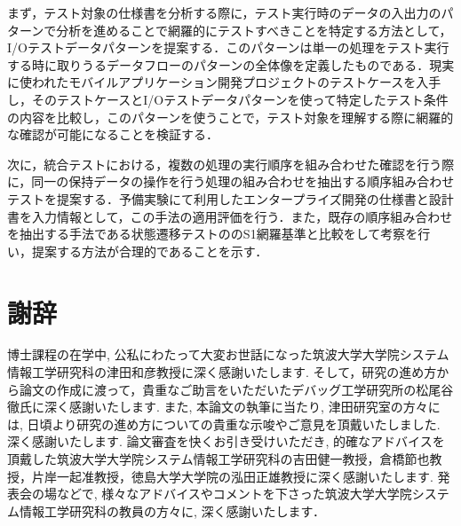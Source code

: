 \documentclass[a4paper,12pt]{jreport}
\begin{document}
まず，テスト対象の仕様書を分析する際に，テスト実行時のデータの入出力のパターンで分析を進めることで網羅的にテストすべきことを特定する方法として，I/Oテストデータパターンを提案する．このパターンは単一の処理をテスト実行する時に取りうるデータフローのパターンの全体像を定義したものである．現実に使われたモバイルアプリケーション開発プロジェクトのテストケースを入手し，そのテストケースとI/Oテストデータパターンを使って特定したテスト条件の内容を比較し，このパターンを使うことで，テスト対象を理解する際に網羅的な確認が可能になることを検証する．

次に，統合テストにおける，複数の処理の実行順序を組み合わせた確認を行う際に，同一の保持データの操作を行う処理の組み合わせを抽出する順序組み合わせテストを提案する．予備実験にて利用したエンタープライズ開発の仕様書と設計書を入力情報として，この手法の適用評価を行う．また，既存の順序組み合わせを抽出する手法である状態遷移テストののS1網羅基準と比較をして考察を行い，提案する方法が合理的であることを示す．

\par
\vspace{0pt plus 1fil}
\newpage

\tableofcontents
\listoffigures
\listoftables

\pagebreak \setcounter{page}{1}








\chapter*{謝辞}
博士課程の在学中, 公私にわたって大変お世話になった筑波大学大学院システム情報工学研究科の津田和彦教授に深く感謝いたします. そして，研究の進め方から論文の作成に渡って，貴重なご助言をいただいたデバッグ工学研究所の松尾谷徹氏に深く感謝いたします.
また, 本論文の執筆に当たり, 津田研究室の方々には, 日頃より研究の進め方についての貴重な示唆やご意見を頂戴いたしました. 深く感謝いたします.
論文審査を快くお引き受けいただき, 的確なアドバイスを頂戴した筑波大学大学院システム情報工学研究科の吉田健一教授，倉橋節也教授，片岸一起准教授，徳島大学大学院の泓田正雄教授に深く感謝いたします.
発表会の場などで, 様々なアドバイスやコメントを下さった筑波大学大学院システム情報工学研究科の教員の方々に, 深く感謝いたします．
\end{document}
